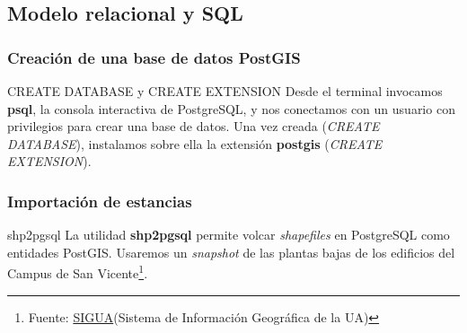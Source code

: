 \documentclass{classes/beamer_GeomaticaUA}
\begin{document}
\subsection{Modelo relacional y SQL}


\begin{frame}[fragile]
\frametitle{Creación de una base de datos PostGIS}

\begin{block}{CREATE DATABASE y CREATE EXTENSION}
Desde el terminal invocamos \textbf{psql}, la consola interactiva de PostgreSQL, y nos conectamos con un usuario con privilegios para crear una base de datos. Una vez creada (\textit{CREATE DATABASE}), instalamos sobre ella la extensión \textbf{postgis} (\textit{CREATE EXTENSION}). 
\end{block}



\end{frame}

\begin{frame}[fragile]
\frametitle{Importación de estancias}

\begin{block}{shp2pgsql}
La utilidad \textbf{shp2pgsql} permite volcar \textit{shapefiles} en PostgreSQL como entidades PostGIS. Usaremos un \textit{snapshot} de las plantas bajas de los edificios del Campus de San Vicente\footnote[frame]{Fuente: \href{http://www.sigua.ua.es}{SIGUA}(Sistema de Información Geográfica de la UA)}.
\end{block}



\end{frame}
\end{document}
